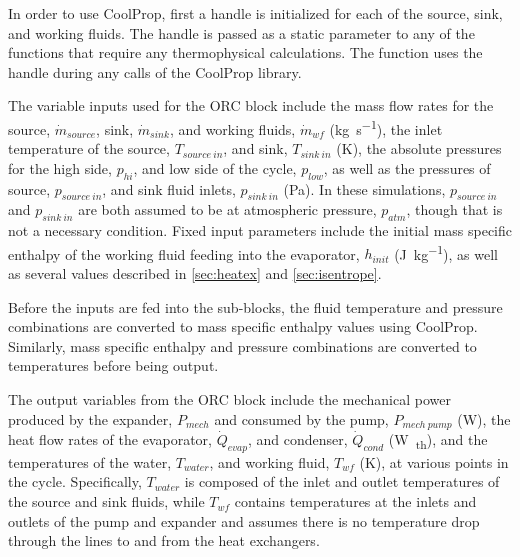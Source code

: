 In order to use CoolProp, first a handle is initialized for each of the source, sink, and working fluids. The handle is passed as a static parameter to any of the functions that require any thermophysical calculations. The function uses the handle during any calls of the CoolProp library.

The variable inputs used for the ORC block include the mass flow rates for the source, $\dot{m}_{source}$, sink, $\dot{m}_{sink}$, and working fluids, $\dot{m}_{wf}$ (\si{\kilogram\per\second}), the inlet temperature of the source, $T_{source\ in}$, and sink, $T_{sink\ in}$ (\si{\kelvin}), the absolute pressures for the high side, $p_{hi}$, and low side of the cycle, $p_{low}$, as well as the pressures of source, $p_{source\ in}$, and sink fluid inlets, $p_{sink\ in}$ (\si{\pascal}). In these simulations, $p_{source\ in}$ and $p_{sink\ in}$ are both assumed to be at atmospheric pressure, $p_{atm}$, though that is not a necessary condition. Fixed input parameters include the initial mass specific enthalpy of the working fluid feeding into the evaporator, $h_{init}$ (\si{\joule\per\kilogram}), as well as several values described in \autoref{sec:heatex} and \autoref{sec:isentrope}.

Before the inputs are fed into the sub-blocks, the fluid temperature and pressure combinations are converted to mass specific enthalpy values using CoolProp. Similarly, mass specific enthalpy and pressure combinations are converted to temperatures before being output.

The output variables from the ORC block include the mechanical power produced by the expander, $P_{mech}$ and consumed by the pump, $P_{mech\ pump}$ (\si{\watt}), the heat flow rates of the evaporator, $\dot{Q}_{evap}$, and condenser, $\dot{Q}_{cond}$ (\si{\watt\textsubscript{th}}), and the temperatures of the water, $T_{water}$, and working fluid, $T_{wf}$ (\si{\kelvin}), at various points in the cycle. Specifically, $T_{water}$ is composed of the inlet and outlet temperatures of the source and sink fluids, while $T_{wf}$ contains temperatures at the inlets and outlets of the pump and expander and assumes there is no temperature drop through the lines to and from the heat exchangers.

